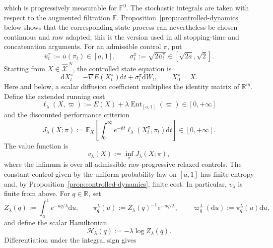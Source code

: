 \documentclass[11pt]{article}
\def\E{\mathbb{E}}
\def\R{\mathbb{R}}
\def\Xc{{\mathcal X}}
\def\hX{\widehat{\Xc}^{\,N}}
\newcommand{\dd}{\mathrm{d}}
\newcommand{\Ent}{\operatorname{Ent}}
\theoremstyle{definition}
\theoremstyle{remark}
\numberwithin{equation}{section}
\begin{document}
which is progressively measurable for $\mathbb F^0$.  The stochastic integrals are taken with
respect to the augmented filtration $\mathbb F$.  Proposition~\ref{prop:controlled-dynamics} below
shows that the corresponding state process can nevertheless be chosen continuous and raw adapted;
this is the version used in all stopping-time and concatenation arguments.
For an admissible control $\pi$, put
\begin{equation}\label{eq:mean-temperature}
 \bar u_t^\pi:=\bar u(\pi_t)\in[a,1],
 \qquad
 \sigma_t^\pi:=\sqrt{2\bar u_t^\pi}\in[\sqrt{2a},\sqrt2].
\end{equation}
Starting from $X\in\hX$, the controlled state equation is
\begin{equation}\label{eq:controlled-SDE}
 \dd X_t^\pi=-\nabla E(X_t^\pi)\dd t+\sigma_t^\pi\dd W_t,
 \qquad X_0^\pi=X.
\end{equation}
Here and below, a scalar diffusion coefficient multiplies the identity matrix of $\R^m$.
Define the extended running cost
\begin{equation}\label{eq:running-cost-notation}
 \ell_\lambda(X,\varpi):=E(X)+\lambda\Ent_{[a,1]}(\varpi)\in[0,+\infty]
\end{equation}
and the discounted performance criterion
\begin{equation}\label{eq:control-cost}
 J_\lambda(X;\pi)
 :=\E_X\left[\int_0^\infty e^{-\vartheta t}
 \ell_\lambda(X_t^\pi,\pi_t)\dd t\right]\in[0,+\infty].
\end{equation}
The value function is
\begin{equation}\label{eq:value-function}
 v_\lambda(X):=\inf_\pi J_\lambda(X;\pi),
\end{equation}
where the infimum is over all admissible raw-progressive relaxed controls.  The constant control
given by the uniform probability law on $[a,1]$ has finite entropy and, by
Proposition~\ref{prop:controlled-dynamics}, finite cost.  In particular, $v_\lambda$ is finite from
above.
For $q\in\R$, set
\begin{equation}\label{eq:partition-H}
 Z_\lambda(q):=\int_a^1e^{-uq/\lambda}\dd u,
 \qquad
 \pi_q^\lambda(u):=Z_\lambda(q)^{-1}e^{-uq/\lambda},
 \qquad
 \varpi_q^\lambda(\dd u):=\pi_q^\lambda(u)\dd u,
\end{equation}
and define the scalar Hamiltonian
\begin{equation}\label{eq:Hamiltonian-control}
 \mathscr H_\lambda(q):=-\lambda\log Z_\lambda(q).
\end{equation}
Differentiation under the integral sign gives
\end{document}
